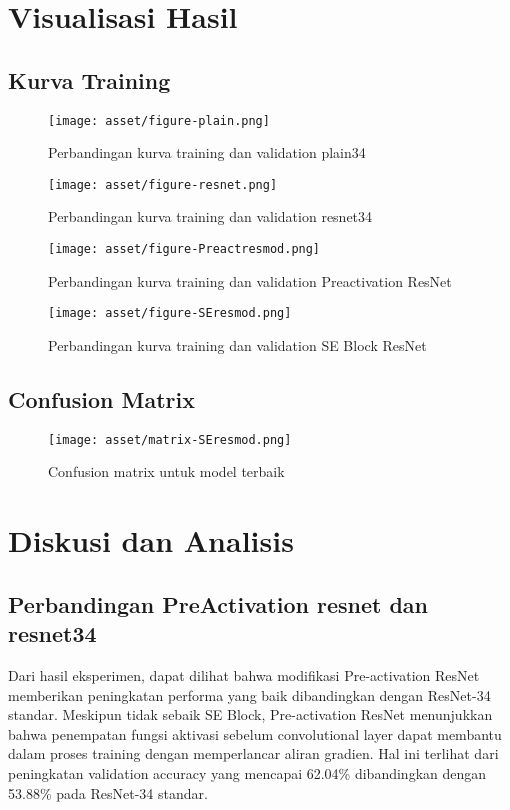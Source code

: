 \documentclass[11pt,a4paper]{article}
\begin{document}
\section{Visualisasi Hasil}

\subsection{Kurva Training}

\begin{figure}[H]
    \centering
    \texttt{[image: asset/figure-plain.png]}
    \caption{Perbandingan kurva training dan validation plain34}
    \label{fig:training-curves}
\end{figure}

\begin{figure}[H]
    \centering
    \texttt{[image: asset/figure-resnet.png]}
    \caption{Perbandingan kurva training dan validation resnet34}
    \label{fig:training-curves}
\end{figure}

\begin{figure}[H]
    \centering
    \texttt{[image: asset/figure-Preactresmod.png]}
    \caption{Perbandingan kurva training dan validation Preactivation ResNet}
    \label{fig:training-curves}
\end{figure}

\begin{figure}[H]
    \centering
    \texttt{[image: asset/figure-SEresmod.png]}
    \caption{Perbandingan kurva training dan validation SE Block ResNet}
    \label{fig:training-curves}
\end{figure}

\subsection{Confusion Matrix}

\begin{figure}[H]
    \centering
    \texttt{[image: asset/matrix-SEresmod.png]}
    \caption{Confusion matrix untuk model terbaik}
    \label{fig:confusion-matrix}
\end{figure}


\section{Diskusi dan Analisis}

\subsection{Perbandingan PreActivation resnet dan resnet34}
Dari hasil eksperimen, dapat dilihat bahwa modifikasi Pre-activation ResNet memberikan peningkatan performa yang baik dibandingkan dengan ResNet-34 standar. Meskipun tidak sebaik SE Block, Pre-activation ResNet menunjukkan bahwa penempatan fungsi aktivasi sebelum convolutional layer dapat membantu dalam proses training dengan memperlancar aliran gradien. Hal ini terlihat dari peningkatan validation accuracy yang mencapai 62.04\% dibandingkan dengan 53.88\% pada ResNet-34 standar.
\end{document}
